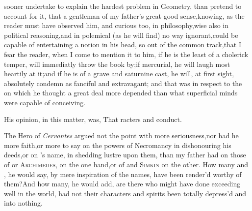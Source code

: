 \documentclass[twoside]{article}
\begin{document}
 sooner undertake to explain
the hardest problem in Geometry,\break
than pretend to account for it, that a\break
gentleman of my father’s great good
sense,\tsh knowing, as the reader must have observed him,
and curious too, in philosophy,\tsk wise also in political
reasoning,\tsk and in polemical (as he will find) no way
ignorant,\tsk could be capable of entertaining a notion in his
head, so out of the common track,\tsk that I fear the reader,
when I come to mention it to him, if he is the least of a cholerick
temper, will immediatly throw the book by;\break if mercurial, he will laugh most
heartily at it;\tsk and if he is of a grave and sa\-turnine cast, he will, at first
sight, abso\-lutely condemn as fanciful and extrava\-gant; and that was in respect
to the\break{} on which he thought a
great deal more depended than what superficial minds were capable of
conceiving.

His opinion, in this matter, was, That
racters and conduct.

The Hero of \textit{Cervantes} argued not the point with more
seriousness,\tsk nor had\break 
he more faith,\tsh or more to say on the\break
powers of Necromancy in dishonouring his
deeds,\tsk or on ’s name, in
shedding lustre upon them, than my father had on those of
 or \textsc{Archimedes}, on the
one hand,\tsk or of  and \textsc{Simkin}
on the other. How many  and
, he would say, by mere inspiration of the
names, have been render’d worthy of them?\break And how many, he would
add, are there who might have done exceeding well in the world,
had not their characters and
spirits been totally depress’d and  into
nothing.
\end{document}
